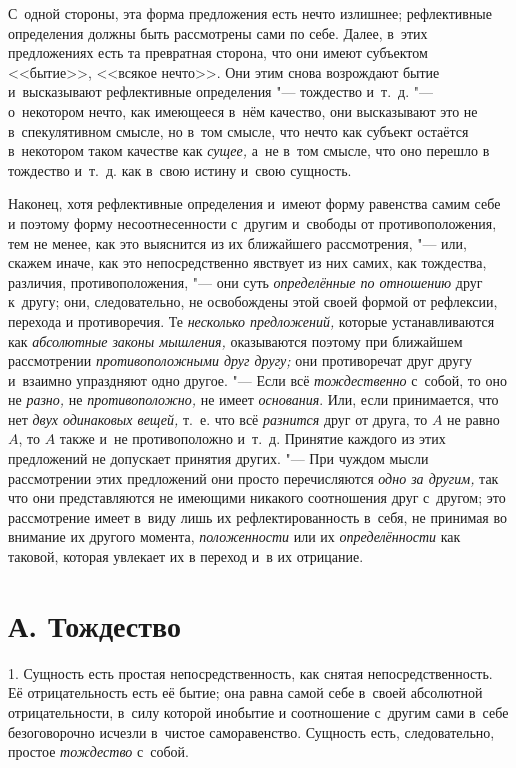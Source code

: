 С~одной стороны, эта форма предложения есть нечто излишнее; рефлективные
определения должны быть рассмотрены сами по себе. Далее, в~этих
предложениях есть та превратная сторона, что они имеют субъектом <<бытие>>,
<<всякое нечто>>. Они этим снова возрождают бытие и~высказывают рефлективные
определения "--- тождество и~т.~д. "--- о~некотором нечто, как имеющееся в~нём
качество, они высказывают это не в~спекулятивном смысле, но в~том смысле,
что нечто как субъект остаётся в~некотором таком качестве как
{\em сущее,} а~не в~том смысле, что оно перешло в
тождество и~т.~д. как в~свою истину и~свою сущность.

Наконец, хотя рефлективные определения и~имеют форму равенства самим себе и
поэтому форму несоотнесенности с~другим и~свободы от противоположения, тем
не менее, как это выяснится из их ближайшего рассмотрения, "--- или, скажем
иначе, как это непосредственно явствует из них самих, как тождества,
различия, противоположения, "--- они суть
{\em определённые по отношению} друг к~другу; они,
следовательно, не освобождены этой своей формой от рефлексии, перехода и
противоречия. Те {\em несколько предложений,} которые
устанавливаются как {\em абсолютные законы мышления,}
оказываются поэтому при ближайшем рассмотрении
{\em противоположными друг другу;} они противоречат
друг другу и~взаимно упраздняют одно другое. "--- Если всё
{\em тождественно} с~собой, то оно не {\em разно,} не
{\em противоположно,} не имеет {\em основания}. Или, если принимается, что нет
{\em двух одинаковых вещей,} т.~е. что всё
{\em разнится} друг от друга, то $A$ не равно
$A$, то $A$ также и~не противоположно и~т.~д. Принятие
каждого из этих предложений не допускает принятия других. "--- При чуждом
мысли рассмотрении этих предложений они просто перечисляются
{\em одно за другим,} так что они представляются не
имеющими никакого соотношения друг с~другом; это рассмотрение имеет в~виду
лишь их рефлектированность в~себя, не принимая во внимание их другого
момента, {\em положенности} или их
{\em определённости} как таковой, которая увлекает их в
переход и~в их отрицание.

\section[А. Тождество]{А. Тождество}
1. Сущность есть простая непосредственность, как
снятая непосредственность. Её отрицательность есть её бытие; она равна
самой себе в~своей абсолютной отрицательности, в~силу которой инобытие и
соотношение с~другим сами в~себе безоговорочно исчезли в~чистое
саморавенство. Сущность есть, следовательно, простое
{\em тождество} с~собой.

